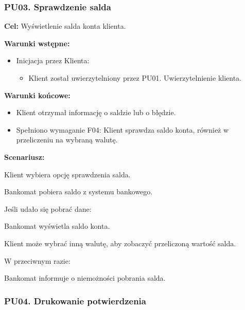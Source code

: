 \documentclass[10pt,a4paper]{article}
\begin{document}
\subsubsection*{PU03. Sprawdzenie salda}

\noindent\textbf{Cel:} Wyświetlenie salda konta klienta.

\noindent\textbf{Warunki wstępne:}
\begin{itemize}
    \item Inicjacja przez Klienta:
    \begin{itemize}
        \item Klient został uwierzytelniony przez PU01. Uwierzytelnienie klienta.
    \end{itemize}
\end{itemize}

\noindent\textbf{Warunki końcowe:}
\begin{itemize}
    \item Klient otrzymał informację o saldzie lub o błędzie.
    \item Spełniono wymaganie F04: Klient sprawdza saldo konta, również w przeliczeniu na wybraną walutę.
\end{itemize}

\noindent\textbf{Scenariusz:}
\begin{scenariusz}
    \item Klient wybiera opcję sprawdzenia salda.
    \item Bankomat pobiera saldo z systemu bankowego.
    \item Jeśli udało się pobrać dane:
    \begin{scenariusz}
        \item Bankomat wyświetla saldo konta.
        \item Klient może wybrać inną walutę, aby zobaczyć przeliczoną wartość salda.
    \end{scenariusz}
    \item W przeciwnym razie:
    \begin{scenariusz}
        \item Bankomat informuje o niemożności pobrania salda.
    \end{scenariusz}
\end{scenariusz}


\subsubsection*{PU04. Drukowanie potwierdzenia}
\end{document}
